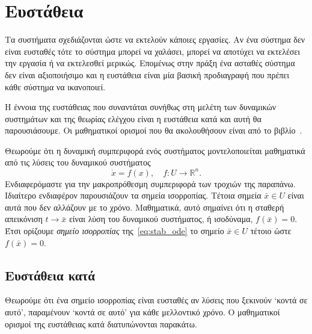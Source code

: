 \chapter{Ευστάθεια}\label{ch:stab}
Τα συστήματα σχεδιάζονται ώστε να εκτελούν κάποιες εργασίες. Αν ένα σύστημα δεν
είναι ευσταθές τότε το σύστημα μπορεί να χαλάσει, μπορεί να αποτύχει να εκτελέσει
την εργασία ή να εκτελεσθεί μερικώς. Επομένως στην πράξη ένα ασταθές σύστημα δεν
είναι αξιοποιήσιμο και η ευστάθεια είναι μία βασική προδιαγραφή που πρέπει κάθε
σύστημα να ικανοποιεί.

Η έννοια της ευστάθειας που συναντάται συνήθως στη μελέτη των δυναμικών
συστημάτων και της θεωρίας ελέγχου είναι η ευστάθεια κατά  και αυτή
θα παρουσιάσουμε. Οι μαθηματικοί ορισμοί που θα ακολουθήσουν είναι από το
βιβλίο~\cite{hirsch1974differential}.

Θεωρούμε ότι η δυναμική συμπεριφορά ενός συστήματος μοντελοποιείται μαθηματικά
από τις λύσεις του δυναμικού συστήματος
\begin{equation}\label{eq:stab_ode}
    \dot{x} = f(x), \quad f:U \to \mathbb{R}^n.
\end{equation}
Ενδιαφερόμαστε για την μακροπρόθεσμη συμπεριφορά των τροχιών της παραπάνω.
Ιδιαίτερο ενδιαφέρον παρουσιάζουν τα σημεία ισορροπίας. Τέτοια σημεία
\( \bar{x} \in U \) είναι αυτά που δεν αλλάζουν με το χρόνο. Μαθηματικά, αυτό
σημαίνει ότι η σταθερή απεικόνιση \( t \to \bar{x} \) είναι λύση του δυναμικού
συστήματος, ή ισοδύναμα, \( f(\bar{x}) = 0 \). Έτσι ορίζουμε \emph{σημείο
ισορροπίας} της~\eqref{eq:stab_ode} το σημείο \( \bar{x} \in U \) τέτοιο ώστε \(
f(\bar{x}) = 0 \).

\section{Ευστάθεια κατά }
Θεωρούμε ότι ένα σημείο ισορροπίας είναι ευσταθές αν λύσεις που ξεκινούν
\enquote*{κοντά σε αυτό}, παραμένουν \enquote*{κοντά σε αυτό} για κάθε μελλοντικό χρόνο.
Ο μαθηματικοί ορισμοί της ευστάθειας κατά  διατυπώνονται παρακάτω.

